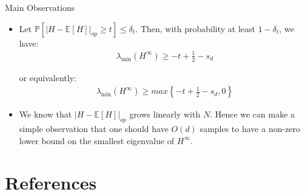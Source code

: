 \documentclass[serif, aspectratio=169]{beamer}
\begin{document}
\begin{frame}{Main Observations}
	\begin{itemize}
		\item 	Let \( \mathbb{P} \left[ \lvert H - \mathbb{E}[H] \rvert_{op} \geq t \right] \leq \delta_t \). Then, with probability at least \( 1 - \delta_t \), we have:
		\begin{align*}
			\lambda_{\min}(H^\infty) \geq -t + \frac{1}{2} - s_d
		\end{align*}

		or equivalently:
		\begin{align*}
			\lambda_{\min}(H^\infty) \geq max \left\{ -t + \frac{1}{2} - s_d, 0 \right\}
		\end{align*}
		\item We know that \( \lvert H - \mathbb{E}[H] \rvert_{op} \) grows linearly with \( N \). Hence we can make a simple observation that one should have $O(d)$ samples to have a non-zero lower bound on the smallest eigenvalue of \(H^\infty\).
	\end{itemize}


	
\end{frame}



%	



\section{References}
\end{document}
